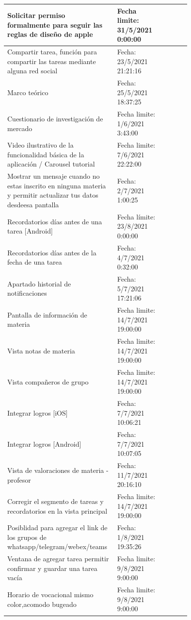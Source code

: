 \documentclass[10pt]{article}
\begin{document}
\begin{table}[H]
\begin{tabular}{|p{0.6\linewidth}|l |p{0.15\linewidth}|}
{Solicitar permiso formalmente para seguir las reglas de diseño de apple} & Fecha limite: 31/5/2021 0:00:00  \\ \hline
{Compartir tarea, función para compartir las tareas mediante alguna red social}  & Fecha: 23/5/2021 21:21:16 \\ \hline
{Marco teórico}                    & Fecha: 25/5/2021 18:37:25  \\ \hline
{Cuestionario de investigación de mercado}        & Fecha limite: 1/6/2021 3:43:00  \\ \hline
{Video ilustrativo de la funcionalidad básica de la aplicación / Carousel tutorial}  &  Fecha limite: 7/6/2021 22:22:00  \\ \hline
{Mostrar un mensaje cuando no estas inscrito en ninguna materia y permitir actualizar tus datos desdeesa pantalla}                                 & Fecha: 2/7/2021 1:00:25  \\ \hline
{Recordatorios días antes de una tarea [Android]} & Fecha límite: 23/8/2021 0:00:00   \\ \hline
{Recordatorios días antes de la fecha de una tarea}  & Fecha: 4/7/2021 0:32:00  \\ \hline
{Apartado historial de notificaciones}        &  Fecha: 5/7/2021 17:21:06\\ \hline
{Pantalla de información de materia}          &  Fecha limite: 14/7/2021 19:00:00 \\ \hline
{Vista notas de materia}                      &  Fecha limite: 14/7/2021 19:00:00  \\ \hline
{Vista compañeros de grupo}                  & Fecha limite: 14/7/2021 19:00:00  \\ \hline
{Integrar logros [iOS]}                      & Fecha: 7/7/2021 10:06:21  \\ \hline
{Integrar logros [Android]}                  & Fecha: 7/7/2021 10:07:05  \\ \hline
{Vista de valoraciones de materia - profesor}      & Fecha: 11/7/2021 20:16:10  \\ \hline
{Corregir el segmento de tareas y recordatorios en la vista principal}   & Fecha limite: 14/7/2021 19:00:00  \\ \hline
{Posiblidad para agregar el link de los grupos de whatsapp/telegram/webex/teams}  & Fecha: 1/8/2021 19:35:26  \\ \hline
{Ventana de agregar tarea permitir confirmar y guardar una tarea vacía}  & Fecha limite: 9/8/2021 9:00:00  \\ \hline
{Horario de vocacional mismo color,acomodo bugeado } & Fecha limite: 9/8/2021 9:00:00  \\ \hline

\end{tabular}
\end{table}
\end{document}
